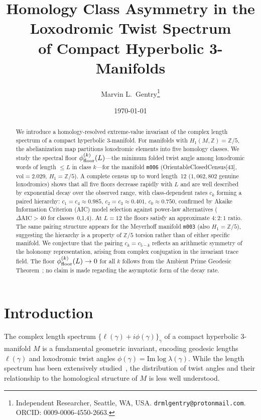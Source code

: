 \documentclass[12pt,a4paper]{article}
\newcommand{\mfld}[1]{\texttt{#1}}
\begin{document}
\title{Homology Class Asymmetry in the Loxodromic Twist Spectrum\\
of Compact Hyperbolic 3-Manifolds}

\author{Marvin L.~Gentry\thanks{Independent Researcher, Seattle, WA, USA.
  \texttt{drmlgentry@protonmail.com}. ORCID: 0009-0006-4550-2663.}}
\date{\today}
\maketitle

\begin{abstract}
We introduce a homology-resolved extreme-value invariant of the complex length
spectrum of a compact hyperbolic 3-manifold.
For manifolds with $H_1(M,\mathbb{Z})=\mathbb{Z}/5$, the abelianization map
partitions loxodromic elements into five homology classes.
We study the spectral floor $\phi_{\rm floor}^{(k)}(L)$---the minimum folded
twist angle among loxodromic words of length $\leq L$ in class $k$---for the
manifold \mfld{m006} (OrientableClosedCensus[43], $\mathrm{vol}=2.029$,
$H_1=\mathbb{Z}/5$).
A complete census up to word length~12 ($1{,}062{,}802$ genuine loxodromics)
shows that all five floors decrease rapidly with $L$ and are well described by
exponential decay over the observed range, with class-dependent rates
$c_k$ forming a paired hierarchy:
$c_1=c_4\approx 0.985$, $c_2=c_3\approx 0.401$, $c_0\approx 0.750$,
confirmed by Akaike Information Criterion (AIC) model selection against
power-law alternatives ($\Delta\mathrm{AIC}>40$ for classes~0,1,4).
At $L=12$ the floors satisfy an approximate $4:2:1$ ratio.
The same pairing structure appears for the Meyerhoff manifold \mfld{m003}
(also $H_1=\mathbb{Z}/5$), suggesting the hierarchy is a property of
$\mathbb{Z}/5$ torsion rather than of either specific manifold.
We conjecture that the pairing $c_k=c_{5-k}$ reflects an arithmetic symmetry
of the holonomy representation, arising from complex conjugation in the
invariant trace field.
The floor $\phi_{\rm floor}^{(k)}(L)\to 0$ for all $k$ follows from the
Ambient Prime Geodesic Theorem~\cite{BalogBiggs23}; no claim is made
regarding the asymptotic form of the decay rate.
\end{abstract}

\section{Introduction}
\label{sec:intro}

The complex length spectrum $\{\ell(\gamma)+i\phi(\gamma)\}_\gamma$ of a
compact hyperbolic 3-manifold $M$ is a fundamental geometric invariant,
encoding geodesic lengths $\ell(\gamma)$ and loxodromic twist angles
$\phi(\gamma)=\mathrm{Im}\log\lambda(\gamma)$.
While the length spectrum has been extensively studied~\cite{MaclachlanReid},
the distribution of twist angles and their relationship to the homological
structure of $M$ is less well understood.
\end{document}
